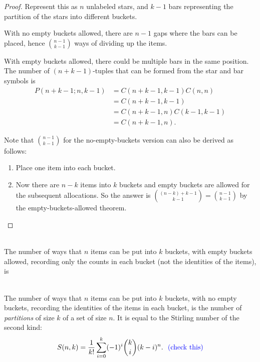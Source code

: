 \begin{proof}
  Represent this as $n$ unlabeled stars, and $k-1$ bars representing the partition of the stars
  into different buckets.

  With no empty buckets allowed, there are $n-1$ gaps where the bars can be placed, hence
  ${n - 1 \choose k - 1}$ ways of dividing up the items.

  With empty buckets allowed, there could be multiple bars in the same position. The number of
  $(n + k - 1)$-tuples that can be formed from the star and bar symbols is
  \begin{align*}
    P(n + k - 1; n, k - 1) &= C(n + k - 1, k - 1)C(n, n)\\
                           &= C(n + k - 1, k - 1)\\
                           &= C(n + k - 1, n)C(k - 1, k - 1)\\
                           &= C(n + k - 1, n).
  \end{align*}

  Note that ${n - 1 \choose k - 1}$ for the no-empty-buckets version can also be derived as
  follows:
  \begin{enumerate}
  \item Place one item into each bucket.
  \item Now there are $n - k$ items into $k$ buckets and empty buckets are allowed for the
    subsequent allocations. So the answer is
    ${(n - k) + k - 1 \choose k - 1} = {n - 1 \choose k - 1}$ by the empty-buckets-allowed theorem.
  \end{enumerate}
\end{proof}

\begin{theorem*}~\\
  The number of ways that $n$ items can be put into $k$ buckets, with empty buckets allowed,
  recording only the counts in each bucket (not the identities of the items), is

\end{theorem*}

\begin{theorem*}[Partitions]~\\
  The number of ways that $n$ items can be put into $k$ buckets, with no empty
  buckets, recording the identities of the items in each bucket, is the number of
  \textit{partitions} of size $k$ of a set of size $n$. It is equal to the
  Stirling number of the second kind:
  \begin{align*}
    S(n, k) = \frac{1}{k!} \sum_{i=0}^k(-1)^i{k \choose i}(k-i)^n. ~~ \textcolor{blue}{\text{(check this)}}
  \end{align*}
\end{theorem*}

